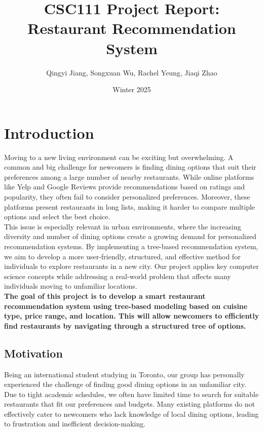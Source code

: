 \documentclass[fontsize=11pt]{article}
\title{CSC111 Project Report: Restaurant Recommendation System}
\author{Qingyi Jiang, Songxuan Wu, Rachel Yeung, Jiaqi Zhao}
\date{Winter 2025}
\begin{document}
\maketitle

\section*{Introduction}
Moving to a new living environment can be exciting but overwhelming. A common and big challenge for newcomers is finding dining options that suit their preferences among a large number of nearby restaurants. While online platforms like Yelp and Google Reviews provide recommendations based on ratings and popularity, they often fail to consider personalized preferences. Moreover, these platforms present restaurants in long lists, making it harder to compare multiple options and select the best choice.\\
This issue is especially relevant in urban environments, where the increasing diversity and number of dining options create a growing demand for personalized recommendation systems. By implementing a tree-based recommendation system, we aim to develop a more user-friendly, structured, and effective method for individuals to explore restaurants in a new city. Our project applies key computer science concepts while addressing a real-world problem that affects many individuals moving to unfamiliar locations.\\
\textbf{The goal of this project is to develop a smart restaurant recommendation system using tree-based modeling based on cuisine type, price range, and location. This will allow newcomers to efficiently find restaurants by navigating through a structured tree of options.}

\subsection*{Motivation}
Being an international student studying in Toronto, our group has personally experienced the challenge of finding good dining options in an unfamiliar city. Due to tight academic schedules, we often have limited time to search for suitable restaurants that fit our preferences and budgets. Many existing platforms do not effectively cater to newcomers who lack knowledge of local dining options, leading to frustration and inefficient decision-making.
\end{document}
